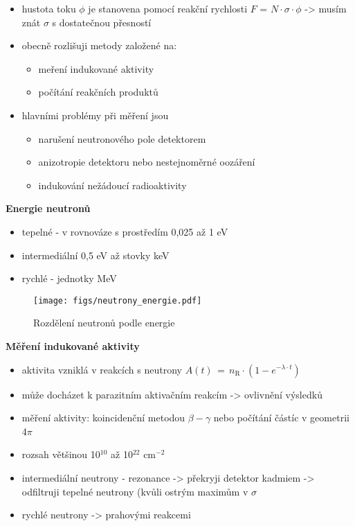 \begin{itemize}
    \item hustota toku $\phi$ je stanovena pomocí reakční rychlosti $F$ = $N \cdot \sigma \cdot \phi$ -> musím znát $\sigma$ s dostatečnou přesností
    \item obecně rozlišuji metody založené na:
    \begin{itemize}
        \item meření indukované aktivity

        \item počítání reakčních produktů
    \end{itemize}
    \item hlavními problémy při měření jsou
    \begin{itemize}
        \item narušení neutronového pole detektorem
        \item anizotropie detektoru nebo nestejnoměrné oozáření
        \item indukování nežádoucí radioaktivity
    \end{itemize}

    
\end{itemize}
\textbf{Energie neutronů}  



\begin{itemize}
    \item tepelné - v rovnováze s prostředím 0,025 až 1 eV
    \item intermediální 0,5 eV až stovky keV
    \item rychlé - jednotky MeV
\end{itemize}

\begin{figure}[ht!]
    \centering
    \texttt{[image: figs/neutrony\_energie.pdf]}
    \caption{Rozdělení neutronů podle energie}
    \label{fig:2_12_energie_neutronu}

\end{figure}
\textbf{Měření indukované aktivity}
\begin{itemize}
    \item aktivita vzniklá v reakcích s neutrony $A(t)\,=\,n_{\text{R}} \cdot (1 - e^{-\lambda \cdot t})$
    \item může docházet k parazitním aktivačním reakcím -> ovlivnění výsledků
    \item měření aktivity: koincidenční metodou $\beta-\gamma$ nebo počítání částíc v geometrii 4$\pi$
    \item rozsah většinou 10$^{10}$ až 10$^{22}$ cm$^{-2}$
    \item intermediální neutrony - rezonance -> překryji detektor kadmiem -> odfiltruji tepelné neutrony (kvůli ostrým maximům v $\sigma$
    \item rychlé neutrony -> prahovými reakcemi

\end{itemize}

